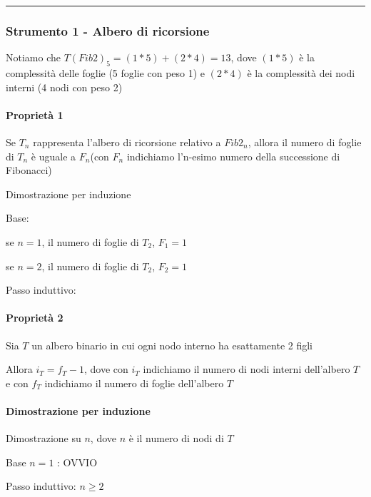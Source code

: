 \documentclass[tikz]{article}
\let\oldparagraph\paragraph
\renewcommand{\paragraph}[1]{\oldparagraph{#1}\mbox{}}
\begin{document}
{{{\begin{center}\rule{0.5\linewidth}{\linethickness}\end{center}

\subsubsection{Strumento 1 - Albero di ricorsione}

{Notiamo che $T(Fib2)_5=(1*5)+(2*4)=13$, dove $(1 * 5)$ è la complessità delle foglie (5 foglie con peso 1) e $(2 * 4)$ è la complessità dei nodi interni (4 nodi con peso 2)}



\paragraph{Proprietà 1}

{Se $T_n$ rappresenta l'albero di ricorsione relativo a $Fib2_n$, allora il numero di foglie di $T_n$ è uguale a $F_n$(con $F_n$ indichiamo l'n-esimo numero della successione di Fibonacci)}

{Dimostrazione per induzione}

{Base:}

{se $n = 1$, il numero di foglie di $T_2$, $F_1=1$}

{se $n = 2$, il numero di foglie di $T_2$, $F_2=1$}

{Passo induttivo:}



\paragraph{Proprietà 2}

{Sia $T$ un albero binario in cui ogni nodo interno ha esattamente 2 figli}

{Allora $i_T=f_T-1$, dove con $i_T$ indichiamo il numero di nodi interni dell'albero $T$ e con $f_T$ indichiamo il numero di foglie dell'albero $T$}

\paragraph{Dimostrazione per induzione}

{Dimostrazione su $n$, dove $n$ è il numero di nodi di $T$}

{Base $n=1$ : OVVIO}

{Passo induttivo: $n \geq 2$}

}}}
\end{document}
